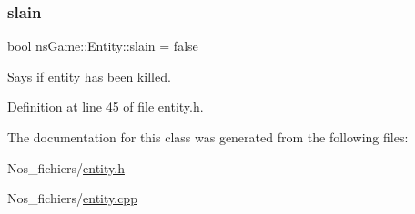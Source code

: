 \subsubsection{\texorpdfstring{slain}{slain}}
{\footnotesize\ttfamily bool ns\+Game\+::\+Entity\+::slain = false}



Says if entity has been killed. 



Definition at line 45 of file entity.\+h.



The documentation for this class was generated from the following files\+:\begin{DoxyCompactItemize}
\item 
Nos\+\_\+fichiers/\hyperlink{entity_8h}{entity.\+h}\item 
Nos\+\_\+fichiers/\hyperlink{entity_8cpp}{entity.\+cpp}\end{DoxyCompactItemize}
